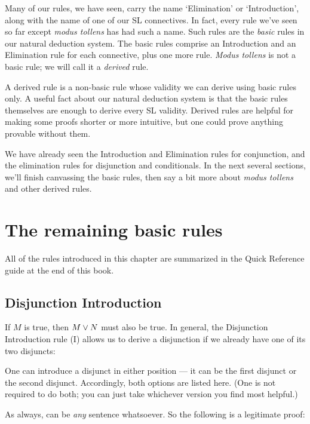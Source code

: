 Many of our rules, we have seen, carry the name `Elimination' or `Introduction', along with the name of one of our SL connectives. In fact, every rule we've seen so far except \emph{modus tollens} has had such a name. Such rules are the \emph{basic} rules in our natural deduction system. The basic rules comprise an Introduction and an Elimination rule for each connective, plus one more rule. \emph{Modus tollens} is not a basic rule; we will call it a \emph{derived} rule.

A derived rule is a non-basic rule whose validity we can derive using basic rules only. A useful fact about our natural deduction system is that the basic rules themselves are enough to derive every SL validity. Derived rules are helpful for making some proofs shorter or more intuitive, but one could prove anything provable without them.

We have already seen the Introduction and Elimination rules for conjunction, and the elimination rules for disjunction and conditionals. In the next several sections, we'll finish canvassing the basic rules, then say a bit more about \emph{modus tollens} and other derived rules.

\section{The remaining basic rules}

All of the rules introduced in this chapter are summarized in the Quick Reference guide at the end of this book.

\subsection{Disjunction Introduction}
If $M$ is true, then $M \vee N$ must also be true. In general, the Disjunction Introduction rule ({\eor}I) allows us to derive a disjunction if we already have one of its two disjuncts:

\begin{ndproof}
	\metaA{}
\end{ndproof}

One can introduce a disjunct in either position --- it can be the first disjunct or the second disjunct. Accordingly, both options are listed here. (One is not required to do both; you can just take whichever version you find most helpful.)

As always, \metaB{} can be \emph{any} sentence whatsoever. So the following is a legitimate proof:

